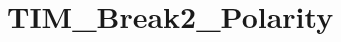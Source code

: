 \hypertarget{group___t_i_m___break2___polarity}{\section{T\-I\-M\-\_\-\-Break2\-\_\-\-Polarity}
\label{group___t_i_m___break2___polarity}
}
